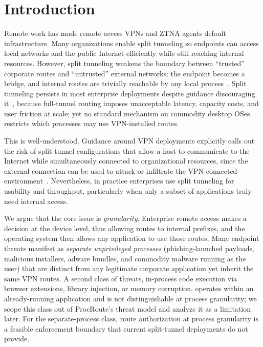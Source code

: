 \documentclass[sigconf]{acmart}
\begin{document}

\maketitle

\section{Introduction}
Remote work has made remote access VPNs and ZTNA agents default infrastructure. Many organizations enable split tunneling so endpoints can access local networks and the public Internet efficiently while still reaching internal resources. However, split tunneling weakens the boundary between ``trusted'' corporate routes and ``untrusted'' external networks: the endpoint becomes a bridge, and internal routes are trivially reachable by any local process~\cite{mitre_lateral}. Split tunneling persists in most enterprise deployments despite guidance discouraging it~\cite{nist_sp80046r2,nist_sp80053r5,nsa_cisa_vpn}, because full-tunnel routing imposes unacceptable latency, capacity costs, and user friction at scale; yet no standard mechanism on commodity desktop OSes restricts which processes may use VPN-installed routes.

This is well-understood. Guidance around VPN deployments explicitly calls out the risk of split-tunnel configurations that allow a host to communicate to the Internet while simultaneously connected to organizational resources, since the external connection can be used to attack or infiltrate the VPN-connected environment~\cite{nist_sp80046r2}.  Nevertheless, in practice enterprises use split tunneling for usability and throughput, particularly when only a subset of applications truly need internal access.

We argue that the core issue is \emph{granularity}. Enterprise
remote access makes a decision at the device level,
thus allowing routes to internal prefixes, and the operating system
then allows any application to use those routes.
Many endpoint threats  manifest as \emph{separate
unprivileged processes} (phishing-launched payloads, malicious
installers, adware bundles, and commodity malware running as the user)
that are distinct from any legitimate corporate
application yet inherit the same VPN routes.
A second class of threats, in-process code execution via browser
extensions, library injection, or memory corruption, operates within
an already-running application and is not distinguishable at process
granularity; we scope this class out of ProcRoute's threat model and
analyze it as a limitation later.
For the separate-process class, route authorization at process
granularity is a feasible enforcement boundary that current
split-tunnel deployments do not provide.
\end{document}
